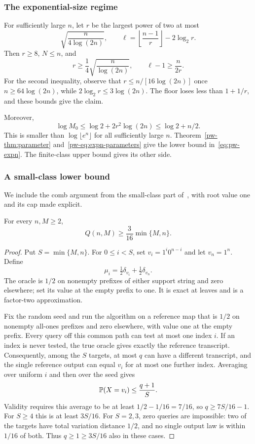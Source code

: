 \subsubsection{The exponential-size regime}

For sufficiently large $n$, let $r$ be the largest power of two at most
\[
\sqrt{\frac{n}{4\log(2n)}},
\qquad
\ell=\left\lfloor\frac{n-1}{r}\right\rfloor-2\log_2r.
\]
Then $r\ge8$, $N\le n$, and
\begin{equation}\label{pw-eq:expn-parameters}
r\ge\frac14\sqrt{\frac{n}{\log(2n)}},
\qquad \ell-1\ge\frac{n}{2r}.
\end{equation}
For the second inequality, observe that $r\le n/[16\log(2n)]$ once $n\ge64\log(2n)$, while $2\log_2r\le3\log(2n)$. The floor loses less than $1+1/r$, and these bounds give the claim.

Moreover,
\[
\log M_0\le\log2+2r^2\log(2n)\le\log2+n/2.
\]
This is smaller than $\log\lfloor e^n\rfloor$ for all sufficiently large $n$. Theorem~\ref{pw-thm:parameter} and~\eqref{pw-eq:expn-parameters} give the lower bound in~\eqref{eq:pw-expn}. The finite-class upper bound gives its other side.

\subsubsection{A small-class lower bound}

We include the comb argument from the small-class part of~\cite[Theorem 4.12]{gmr}, with root value one and its cap made explicit.

\begin{lemma}\label{pw-lem:comb}
For every $n,M\ge2$,
\[
Q(n,M)\ge\frac3{16}\min\{M,n\}.
\]
\end{lemma}
\begin{proof}
Put $S=\min\{M,n\}$. For $0\le i<S$, set $v_i=1^i0^{n-i}$ and let $v_n=1^n$. Define
\[
\mu_i=\tfrac12\delta_{v_i}+\tfrac12\delta_{v_n}.
\]
The oracle is $1/2$ on nonempty prefixes of either support string and zero elsewhere; set its value at the empty prefix to one. It is exact at leaves and is a factor-two approximation.

Fix the random seed and run the algorithm on a reference map that is $1/2$ on nonempty all-ones prefixes and zero elsewhere, with value one at the empty prefix. Every query off this common path can test at most one index $i$. If an index is never tested, the true oracle gives exactly the reference transcript. Consequently, among the $S$ targets, at most $q$ can have a different transcript, and the single reference output can equal $v_i$ for at most one further index. Averaging over uniform $i$ and then over the seed gives
\[
\mathbb P(X=v_i)\le\frac{q+1}{S}.
\]
Validity requires this average to be at least $1/2-1/16=7/16$, so $q\ge7S/16-1$. For $S\ge4$ this is at least $3S/16$. For $S=2,3$, zero queries are impossible: two of the targets have total variation distance $1/2$, and no single output law is within $1/16$ of both. Thus $q\ge1\ge3S/16$ also in these cases.
\end{proof}

